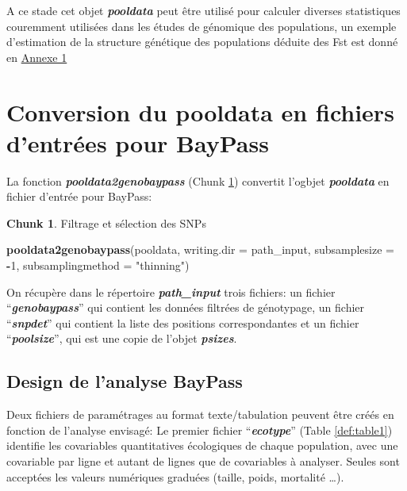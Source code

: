\documentclass[
  openany]{book}
\newenvironment{Shaded}{\begin{snugshade}}{\end{snugshade}}
\newcommand{\AttributeTok}[1]{\textcolor[rgb]{0.13,0.29,0.53}{#1}}
\newcommand{\DecValTok}[1]{\textcolor[rgb]{0.00,0.00,0.81}{#1}}
\newcommand{\FunctionTok}[1]{\textcolor[rgb]{0.13,0.29,0.53}{\textbf{#1}}}
\newcommand{\NormalTok}[1]{#1}
\newcommand{\SpecialCharTok}[1]{\textcolor[rgb]{0.81,0.36,0.00}{\textbf{#1}}}
\newcommand{\StringTok}[1]{\textcolor[rgb]{0.31,0.60,0.02}{#1}}
\theoremstyle{definition}
\theoremstyle{definition}
\theoremstyle{definition}
\newtheorem{exercise}{Chunk}[chapter]
\theoremstyle{definition}
\theoremstyle{remark}
\begin{document}
A ce stade cet objet \textbf{\emph{pooldata}} peut être utilisé pour calculer diverses statistiques couremment utilisées dans les études de génomique des populations, un exemple d'estimation de la structure génétique des populations déduite des Fst est donné en \protect\hyperlink{An1}{Annexe 1}

\hypertarget{conversion-du-pooldata-en-fichiers-dentruxe9es-pour-baypass}{%
\chapter*{Conversion du pooldata en fichiers d'entrées pour BayPass}\label{conversion-du-pooldata-en-fichiers-dentruxe9es-pour-baypass}}

La fonction \textbf{\emph{pooldata2genobaypass}} (Chunk \ref{exr:chunk3}) convertit l'ogbjet \textbf{\emph{pooldata}} en fichier d'entrée pour BayPass:

\begin{exercise}
\protect\hypertarget{exr:chunk3}{}\label{exr:chunk3}{Filtrage et sélection des SNPs}
\end{exercise}

\begin{Shaded}
\begin{Highlighting}[]
\FunctionTok{pooldata2genobaypass}\NormalTok{(pooldata, }\AttributeTok{writing.dir =}\NormalTok{ path\_input, }\AttributeTok{subsamplesize =} \SpecialCharTok{{-}}\DecValTok{1}\NormalTok{, }\AttributeTok{subsamplingmethod =} \StringTok{"thinning"}\NormalTok{)}
\end{Highlighting}
\end{Shaded}

On récupère dans le répertoire \textbf{\emph{path\_input}} trois fichiers: un fichier ``\textbf{\emph{genobaypass}}'' qui contient les données filtrées de génotypage, un fichier ``\textbf{\emph{snpdet}}'' qui contient la liste des positions correspondantes et un fichier ``\textbf{\emph{poolsize}}'', qui est une copie de l'objet \textbf{\emph{psizes}}.

\hypertarget{design-de-lanalyse-baypass}{%
\section*{Design de l'analyse BayPass}\label{design-de-lanalyse-baypass}}

Deux fichiers de paramétrages au format texte/tabulation peuvent être créés en fonction de l'analyse envisagé:
Le premier fichier ``\textbf{\emph{ecotype}}'' (Table \ref{def:table1}) identifie les covariables quantitatives écologiques de chaque population, avec une covariable par ligne et autant de lignes que de covariables à analyser. Seules sont acceptées les valeurs numériques graduées (taille, poids, mortalité \ldots).
\end{document}
